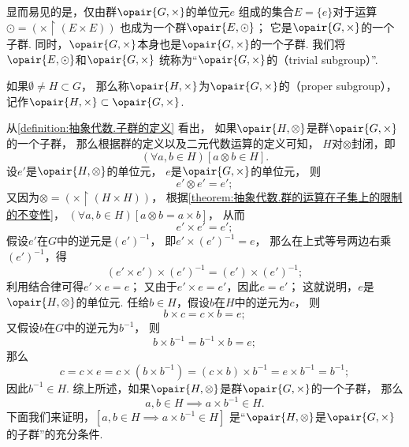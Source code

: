 显而易见的是，仅由群\(\opair{G,\times}\)的单位元\(e\)%
组成的集合\(E=\{e\}\)对于运算\(\odot=(\times\upharpoonright(E\times E))\)%
也成为一个群\(\opair{E,\odot}\)；
它是\(\opair{G,\times}\)的一个子群.
同时，\(\opair{G,\times}\)本身也是\(\opair{G,\times}\)的一个子群.
我们将\(\opair{E,\odot}\)和\(\opair{G,\times}\)%
统称为“\(\opair{G,\times}\)的（trivial subgroup）”.

如果\(\emptyset \neq H \subset G\)，
那么称\(\opair{H,\times}\)为\(\opair{G,\times}\)的（proper subgroup），
记作\(\opair{H,\times}\subset\opair{G,\times}\).

从\cref{definition:抽象代数.子群的定义} 看出，
如果\(\opair{H,\otimes}\)是群\(\opair{G,\times}\)的一个子群，
那么根据群的定义以及二元代数运算的定义可知，
\(H\)对\(\otimes\)封闭，即\[
	(\forall a,b \in H)[a \otimes b \in H].
\]
设\(e'\)是\(\opair{H,\otimes}\)的单位元，
\(e\)是\(\opair{G,\times}\)的单位元，
则\[
	e' \otimes e' = e';
\]
又因为\(\otimes = (\times \upharpoonright(H \times H))\)，
根据\cref{theorem:抽象代数.群的运算在子集上的限制的不变性}，
\((\forall a,b \in H)[a \otimes b = a \times b]\)，
从而\[
	e' \times e' = e';
\]
假设\(e'\)在\(G\)中的逆元是\((e')^{-1}\)，
即\(e' \times (e')^{-1} = e\)，
那么在上式等号两边右乘\((e')^{-1}\)，得\[
	(e' \times e') \times (e')^{-1} = (e') \times (e')^{-1};
\]
利用结合律可得\(e' \times e = e\)；
又由于\(e' \times e = e'\)，因此\(e = e'\)；
这就说明，\(e\)是\(\opair{H,\otimes}\)的单位元.
任给\(b \in H\)，假设\(b\)在\(H\)中的逆元为\(c\)，
则\[
	b \times c = c \times b = e;
\]
又假设\(b\)在\(G\)中的逆元为\(b^{-1}\)，
则\[
	b \times b^{-1} = b^{-1} \times b = e;
\]
那么\[
	c = c \times e
	= c \times (b \times b^{-1})
	= (c \times b) \times b^{-1}
	= e \times b^{-1}
	= b^{-1};
\]
因此\(b^{-1} \in H\).
综上所述，如果\(\opair{H,\otimes}\)是群\(\opair{G,\times}\)的一个子群，
那么\[
	a,b \in H
	\implies
	a \times b^{-1} \in H.
\]
下面我们来证明，\([a,b \in H \implies a \times b^{-1} \in H]\)
是“\(\opair{H,\otimes}\)是\(\opair{G,\times}\)的子群”的充分条件.
